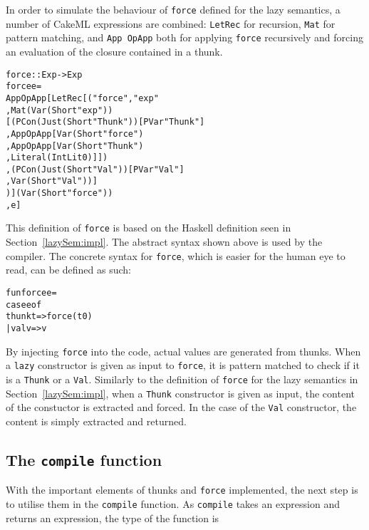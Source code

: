 In order to simulate the behaviour of \texttt{force} defined for the lazy
semantics, a number of CakeML expressions are combined:
\texttt{LetRec} for recursion, \texttt{Mat} for pattern
matching, and \texttt{App OpApp} both for applying \texttt{force} recursively
and forcing an evaluation of the closure contained in a thunk.

\begin{alltt}
force :: Exp -> Exp
force e =
  App OpApp [LetRec [("force", "exp"
                     , Mat (Var (Short "exp"))
                       [(PCon (Just (Short "Thunk")) [PVar "Thunk"]
                        , App OpApp [Var (Short "force")
                                    , App OpApp [Var (Short "Thunk")
                                                , Literal (IntLit 0)]])
                       ,(PCon (Just (Short "Val")) [PVar "Val"]
                        , Var (Short "Val"))]
                     )] (Var (Short "force"))
            , e]
\end{alltt}

\noindent This definition of \texttt{force} is based on the Haskell definition
seen in Section~\ref{lazySem:impl}. The abstract syntax shown above is used by
the compiler. The concrete syntax for \texttt{force}, which is easier for the
human eye to read, can be defined as such:
\newpage
\begin{alltt}
  fun force e =
    case e of
      thunk t => force (t 0)
    | val v   => v
\end{alltt}


\noindent By injecting \texttt{force} into the code, actual values are generated
from thunks. When a \texttt{lazy} constructor is given
as input to \texttt{force}, it is pattern matched to check if it is a
\texttt{Thunk} or a \texttt{Val}. Similarly to the definition of \texttt{force}
for the lazy semantics in Section~\ref{lazySem:impl}, when a \texttt{Thunk}
constructor is given as input, the content of the constuctor is extracted and
forced. In the case of the \texttt{Val} constructor, the content is simply
extracted and returned.

\subsection{The \texttt{compile} function}
With the important elements of thunks and \texttt{force} implemented, the next
step is to utilise them in the \texttt{compile} function. 
As \texttt{compile} takes an expression and returns an expression, the type of
the function is

